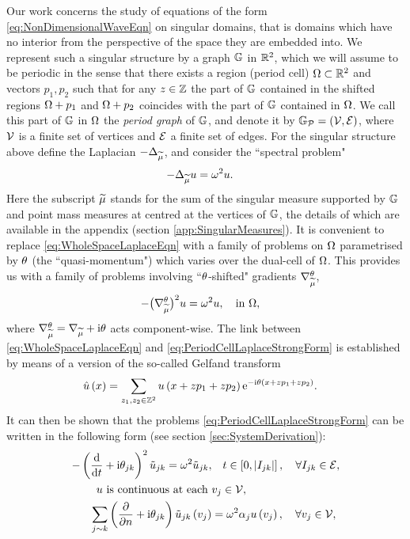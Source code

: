 Our work concerns the study of equations of the form \eqref{eq:NonDimensionalWaveEqn} on singular domains, that is domains which have no interior from the perspective of the space they are embedded into.
We represent such a singular structure by a graph $\mathbb{G}$ in $\mathbb{R}^2$, which we will assume to be periodic in the sense that there exists a region (period cell) $\Omega\subset\mathbb{R}^2$ and vectors $p_1, p_2$ such that for any $z\in\mathbb{Z}$ the part of $\mathbb{G}$ contained in the shifted regions $\Omega+p_1$ and $\Omega+p_2$ coincides with the part of $\mathbb{G}$ contained in $\Omega$.
We call this part of $\mathbb{G}$ in $\Omega$ the \emph{period graph} of $\mathbb{G}$, and denote it by $\mathbb{G}_{\mathcal{P}}=\left( \mathcal{V}, \mathcal{E} \right)$, where $\mathcal{V}$ is a finite set of vertices and $\mathcal{E}$ a finite set of edges.
For the singular structure above define the Laplacian $-\Delta_{\widetilde{\mu}}$, and consider the ``spectral problem"
\begin{align} \label{eq:WholeSpaceLaplaceEqn}
	-\Delta_{\widetilde{\mu}} u &= \omega^2 u.
\end{align}
Here the subscript $\widetilde{\mu}$ stands for the sum of the singular measure supported by $\mathbb{G}$ and point mass measures at centred at the vertices of $\mathbb{G}$, the details of which are available in the appendix (section \ref{app:SingularMeasures}).
It is convenient to replace \eqref{eq:WholeSpaceLaplaceEqn} with a family of problems on $\Omega$ parametrised by $\theta$ (the ``quasi-momentum") which varies over the dual-cell of $\Omega$.
This provides us with a family of problems involving ``$\theta$-shifted" gradients $\nabla^{\theta}_{\widetilde{\mu}}$,
\begin{align} \label{eq:PeriodCellLaplaceStrongForm}
	-\bigl(\nabla^{\theta}_{\widetilde{\mu}}\bigr)^2 u &= \omega^2 u, \quad\text{in } \Omega,
\end{align}
where $\nabla^{\theta}_{\widetilde{\mu}} = \nabla_{\widetilde{\mu}} + \mathrm{i}\theta$ acts component-wise.
The link between \eqref{eq:WholeSpaceLaplaceEqn} and \eqref{eq:PeriodCellLaplaceStrongForm} is established by means of a version of the so-called Gelfand transform \cite{gelfand1950expansion}
\begin{align*}
	\hat{u}\left( x \right) &= \sum_{z_1,z_2\in\mathbb{Z}^2}u\left( x+zp_1+zp_2 \right)\mathrm{e}^{-\mathrm{i}\theta\left( x+zp_1+zp_2 \right)}.
\end{align*}
It can then be shown that the problems \eqref{eq:PeriodCellLaplaceStrongForm} can be written in the following form (see section \ref{sec:SystemDerivation}):
\begin{subequations} \label{eq:QGFullSystem}
	\begin{align}
		-\left( \dfrac{\mathrm{d}}{\mathrm{d}t} + \mathrm{i}\theta_{jk} \right)^2 \tilde{u}_{jk} = \omega^2 \tilde{u}_{jk}, &\quad t\in\left[ 0,\left\lvert I_{jk} \right\rvert \right], \quad \forall I_{jk}\in \mathcal{E}, \label{eq:QGEdgeODEs} \\
		u \text{ is continuous at each } &v_j \in \mathcal{V}, \label{eq:QGVertCty}\\
		\sum_{j\sim k}\left( \dfrac{\partial }{\partial n} + \mathrm{i}\theta_{jk} \right)\tilde{u}_{jk}\left( v_j \right) &= \omega^2\alpha_{j}u\left( v_j \right), \quad \forall v_j \in \mathcal{V}, \label{eq:QGDerivCondition}
	\end{align}
\end{subequations}
